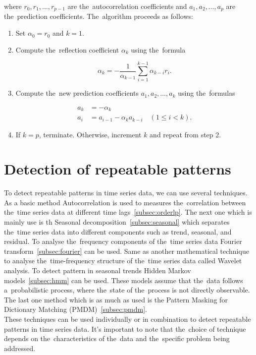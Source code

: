 where $r_0, r_1, \ldots, r_{p-1}$ are the~autocorrelation coefficients and $a_1, a_2, \ldots, a_p$ are the~prediction coefficients. The~algorithm proceeds as follows:\\

\begin{enumerate}
    \item Set $\alpha_0 = r_0$ and $k = 1$.
    \item Compute the~reflection coefficient $\alpha_k$ using the~formula

    \begin{equation*}
        \alpha_k = -\frac{1}{\alpha_{k-1}} \sum_{i=1}^{k-1} \alpha_{k-i} r_i.
    \end{equation*}

    \item Compute the~new prediction coefficients $a_1, a_2, \ldots, a_k$ using the~formulas

    \begin{align*}
        a_k &= -\alpha_k \\
        a_i &= a_{i-1} - \alpha_k a_{k-i} \quad (1 \leq i < k).
    \end{align*}

    \item If $k = p$, terminate. Otherwise, increment $k$ and repeat from step 2.
\end{enumerate}


\section{Detection of repeatable patterns}\label{sec:patterns}
To detect repeatable patterns in time series data, we can use several techniques. As a basic method Autocorrelation is used to measures the~correlation between the~time series data at different time lags~\ref{subsec:orderlp}. The next one which is mainly use is th Seasonal decomposition~\ref{subsec:seasonal} which separates the~time series data into different components
such as trend, seasonal, and residual. To analyse the~frequency components of the~time series data Fourier transform~\ref{subsec:fourier} can be used. Same as another mathematical technique to analyse the~time-frequency structure of the~time series data called Wavelet analysis.
To detect pattern in seasonal trends Hidden Markov models~\ref{subsec:hmm} can be used.
These models assume that the~data follows a~probabilistic process, where the~state of the~process is not directly observable. The last one method which is as much as used is the Pattern Masking for Dictionary Matching (PMDM)~\ref{subsec:pmdm}.\\
These techniques can be used individually or in combination to detect repeatable patterns in time series data. It's important to note that the~choice of technique depends on the~characteristics of the~data and the~specific problem being addressed.


